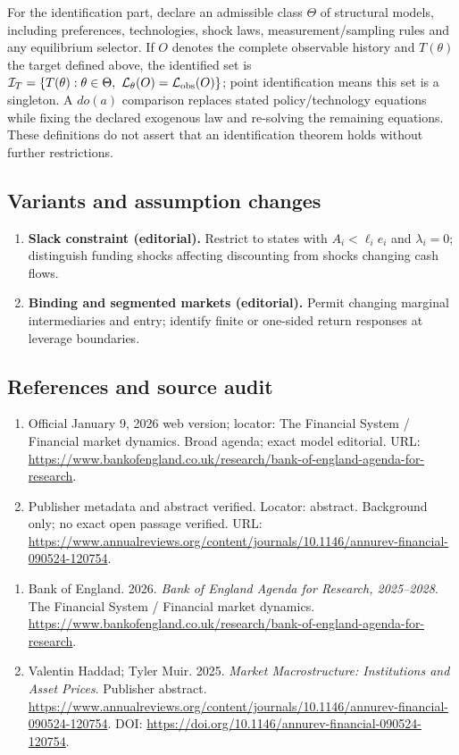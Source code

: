 \documentclass[11pt,a4paper]{article}
\begin{document}
For the identification part, declare an admissible class \(\Theta\) of structural models, including preferences, technologies, shock laws, measurement/sampling rules and any equilibrium selector. If \(O\) denotes the complete observable history and \(T(\theta)\) the target defined above, the identified set is \(\mathcal I_T=\{T(\theta):\theta\in\Theta,\ \mathcal L_\theta(O)=\mathcal L_{\rm obs}(O)\}\); point identification means this set is a singleton. A \(do(a)\) comparison replaces stated policy/technology equations while fixing the declared exogenous law and re-solving the remaining equations. These definitions do not assert that an identification theorem holds without further restrictions.
\subsection*{Variants and assumption changes}
\begin{enumerate}
\item \textbf{Slack constraint (editorial).} Restrict to states with \(A_i<\ell_i e_i\) and \(\lambda_i=0\); distinguish funding shocks affecting discounting from shocks changing cash flows.
\item \textbf{Binding and segmented markets (editorial).} Permit changing marginal intermediaries and entry; identify finite or one-sided return responses at leverage boundaries.
\end{enumerate}
\subsection*{References and source audit}
\begin{enumerate}
\item Official January 9, 2026 web version; locator: The Financial System / Financial market dynamics. Broad agenda; exact model editorial. URL: \url{https://www.bankofengland.co.uk/research/bank-of-england-agenda-for-research}.
\item Publisher metadata and abstract verified. Locator: abstract. Background only; no exact open passage verified. URL: \url{https://www.annualreviews.org/content/journals/10.1146/annurev-financial-090524-120754}.
\end{enumerate}
\begin{enumerate}\raggedright
\item\hypertarget{definitions:source:30007598:1}{} Bank of England. 2026. \emph{Bank of England Agenda for Research, 2025–2028}. The Financial System / Financial market dynamics.
\url{https://www.bankofengland.co.uk/research/bank-of-england-agenda-for-research}.
\item\hypertarget{definitions:source:30007598:2}{} Valentin Haddad; Tyler Muir. 2025. \emph{Market Macrostructure: Institutions and Asset Prices}. Publisher abstract.
\url{https://www.annualreviews.org/content/journals/10.1146/annurev-financial-090524-120754}.
DOI: \url{https://doi.org/10.1146/annurev-financial-090524-120754}.
\end{enumerate}
\end{document}
